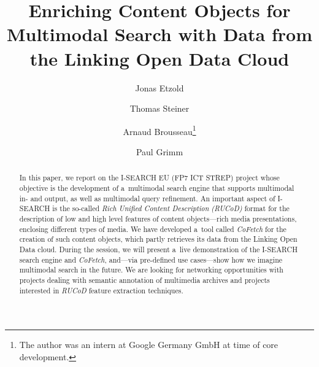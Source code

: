 \documentclass[runningheads,a4paper]{llncs}
\begin{document}
\mainmatter

\title{Enriching Content Objects for Multimodal Search with Data from the Linking Open Data Cloud}

\author{Jonas Etzold \and Thomas Steiner \and Arnaud Brousseau\thanks{The author was an intern at Google Germany GmbH at time of core development.} \and Paul Grimm}


\maketitle

\setcounter{footnote}{0}

\begin{abstract}
In this paper, we report on the \mbox{I-SEARCH} EU (FP7 ICT STREP) project
whose objective is the development of a~multimodal search engine that supports multimodal
in- and output, as well as multimodal query refinement.
An important aspect of \mbox{I-SEARCH} is the so-called
\emph{Rich Unified Content Description} \emph{\mbox{(RUCoD)}} format
for the description of low and high level features of content objects---rich
media presentations, enclosing different types of media.
We have developed a~tool called \mbox{\emph{CoFetch}}
for the creation of such content objects,
which partly retrieves its data from the Linking Open Data cloud.
During the session, we will present a~live demonstration of the \mbox{I-SEARCH}
search engine and \mbox{\emph{CoFetch}}, and---via pre-defined use cases---show
how we imagine multimodal search in the future.
We are looking for networking opportunities with projects dealing with
semantic annotation of multimedia archives and 
projects interested in \emph{RUCoD} feature extraction techniques.
\end{abstract}
\end{document}
